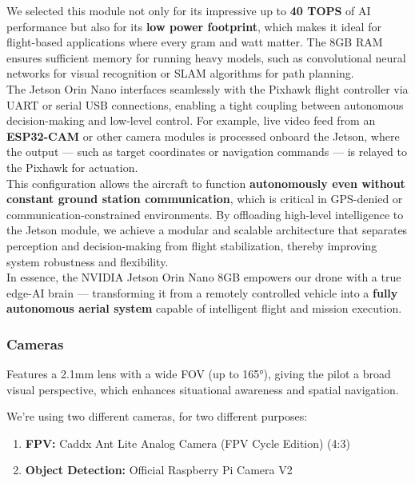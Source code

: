 \documentclass[12pt]{report}
\begin{document}
      We selected this module not only for its impressive up to \textbf{40 TOPS} of AI performance but also for its \textbf{low power footprint}, which makes it ideal for flight-based applications where every gram and watt matter. The 8GB RAM ensures sufficient memory for running heavy models, such as convolutional neural networks for visual recognition or SLAM algorithms for path planning. \\

      The Jetson Orin Nano interfaces seamlessly with the Pixhawk flight controller via UART or serial USB connections, enabling a tight coupling between autonomous decision-making and low-level control. For example, live video feed from an \textbf{ESP32-CAM} or other camera modules is processed onboard the Jetson, where the output — such as target coordinates or navigation commands — is relayed to the Pixhawk for actuation. \\

      This configuration allows the aircraft to function \textbf{autonomously even without constant ground station communication}, which is critical in GPS-denied or communication-constrained environments. By offloading high-level intelligence to the Jetson module, we achieve a modular and scalable architecture that separates perception and decision-making from flight stabilization, thereby improving system robustness and flexibility. \\

      In essence, the NVIDIA Jetson Orin Nano 8GB empowers our drone with a true edge-AI brain — transforming it from a remotely controlled vehicle into a \textbf{fully autonomous aerial system} capable of intelligent flight and mission execution.

      \subsubsection{\large Cameras}
Features a 2.1mm lens with a wide FOV (up to 165°), giving the pilot a broad visual perspective, which enhances situational awareness and spatial navigation.

      We're using two different cameras, for two different purposes:
      \begin{enumerate}
          \item \textbf{FPV:} Caddx Ant Lite Analog Camera (FPV Cycle Edition) (4:3)
          \item \textbf{Object Detection:} Official Raspberry Pi Camera V2
      \end{enumerate}
\end{document}
